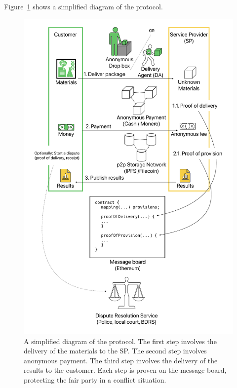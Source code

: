 \documentclass[pdftex,twocolumn,epjc3]{svjour3}
\begin{document}
Figure~\ref{fig:protocol-overview} shows a simplified diagram of the protocol.

\begin{figure}[h!]
\includegraphics[width=\linewidth]{protocol-overview.pdf}
\centering
\caption{A simplified diagram of the protocol. The first step involves the delivery of the materials to the SP. The second step involves anonymous payment. The third step involves the delivery of the results to the customer. Each step is proven on the message board, protecting the fair party in a conflict situation.}

\label{fig:protocol-overview}
\end{figure}
\end{document}
